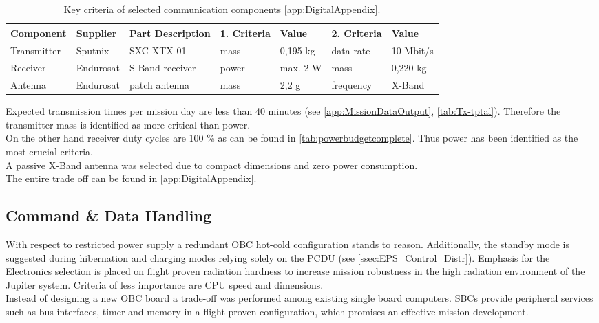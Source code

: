\begin{table}[h]
\centering
\caption{Key criteria of selected communication components \autoref{app:DigitalAppendix}.}
\begin{tabular}{lll|ll|ll}
\toprule
Component   & Supplier  & Part Description     & 1. Criteria   & Value    & 2. Criteria & Value          \\
\midrule
Transmitter & Sputnix   & SXC-XTX-01           & mass          & 0,195 kg & data rate   & 10 Mbit/s \\
Receiver    & Endurosat & S-Band receiver      & power         & max. 2 W & mass        & 0,220 kg       \\
Antenna     & Endurosat & patch antenna & mass          & 2,2 g    & frequency   & X-Band         \\
\bottomrule
\end{tabular}
\label{tab:ComCompComp}
\end{table}

Expected transmission times per mission day are less than 40 minutes (see \autoref{app:MissionDataOutput}, \autoref{tab:Tx-tptal}). Therefore the transmitter mass is identified as more critical than power. \\
On the other hand receiver duty cycles are 100 \% as can be found in \autoref{tab:powerbudgetcomplete}. Thus power has been identified as the most crucial criteria. \\
A passive X-Band antenna was selected due to compact dimensions and zero power consumption.  \\
The entire trade off can be found in \autoref{app:DigitalAppendix}.

 \subsection{Command \& Data Handling} \label{C&DH}
 
 With respect to restricted power supply a redundant OBC hot-cold configuration stands to reason. Additionally, the standby mode is suggested during hibernation and charging modes relying solely on the PCDU (see \autoref{ssec:EPS_Control_Distr}). 
Emphasis for the Electronics selection is placed on flight proven radiation hardness to increase mission robustness in the high radiation environment of the Jupiter system. 
Criteria of less importance are CPU speed and dimensions. \\

Instead of designing a new OBC board a trade-off was performed among existing single board computers. SBCs provide peripheral services such as bus interfaces, timer and memory in a flight proven configuration, which promises an effective mission development. \\

